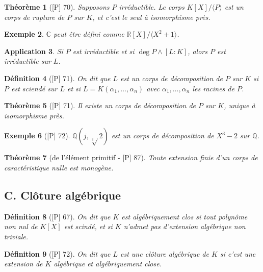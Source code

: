 \documentclass[10pt, a4paper, parskip=full, twoside, twocolumn]{report}
\newtheorem{definition}{Définition}
\newtheorem{theorem}[definition]{Théorème}
\newtheorem{example}[definition]{Exemple}
\newtheorem{application}[definition]{Application}
\newcommand{\IQ}{\mathbb{Q}}
\newcommand{\IC}{\mathbb{C}}
\newcommand{\IR}{\mathbb{R}}
\begin{document}
\begin{theorem}[\textnormal{[P] 70}]
	Supposons $P$ irréductible. Le corps $K[X]/\langle P\rangle$ est un corps de rupture de $P$ sur $K$, et c'est le seul à isomorphisme près.
\end{theorem}

\begin{example}
	$\IC$ peut être défini comme $\IR[X]/\langle X^2 + 1 \rangle$.
\end{example}

\begin{application}
	Si $P$ est irréductible et si $\deg P \wedge [L:K]$, alors $P$ est irréductible sur $L$.
\end{application}

\begin{definition}[\textnormal{[P] 71}]
	On dit que $L$ est un \emph{corps de décomposition de $P$ sur $K$} si $P$ est sciendé sur $L$ et si $L = K(\alpha_1,\dots,\alpha_n)$ avec $\alpha_1,\dots,\alpha_n$ les racines de $P$.
\end{definition}

\begin{theorem}[\textnormal{[P] 71}]
	Il existe un corps de décomposition de $P$ sur $K$, unique à isomorphisme près.
\end{theorem}

\begin{example}[\textnormal{[P] 72}]
	$\IQ(j,\sqrt[3]{}2)$ est un corps de décomposition de $X^3 - 2$ sur $\IQ$.
\end{example}

\begin{theorem}[de l'élément primitif - \textnormal{[P] 87}]
	Toute extension finie d'un corps de caractéristique nulle est monogène.
\end{theorem}

\subsection*{C. Clôture algébrique}
\begin{definition}[\textnormal{[P] 67}]
	On dit que $K$ est \emph{algébriquement clos} si tout polynôme non nul de $K[X]$ est scindé, et si $K$ n'admet pas d'extension algébrique non triviale.
\end{definition}

\begin{definition}[\textnormal{[P] 72}]
	On dit que $L$ est une \emph{clôture algébrique} de $K$ si c'est une extension de $K$ algébrique et algébriquement close.
\end{definition}
\end{document}
